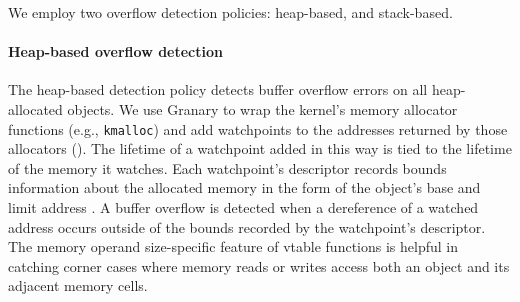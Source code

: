 \documentclass[letterpaper,twocolumn,10pt]{article}
\begin{document}
We employ two overflow detection policies: heap-based, and stack-based. %


\paragraph{Heap-based overflow detection \label{sec:heap_overflow}}
The heap-based detection policy detects buffer overflow errors on all heap-allocated objects. We use Granary to wrap the kernel's memory allocator functions (e.g., \texttt{kmalloc}) and add watchpoints to the addresses returned by those allocators (). The lifetime of a watchpoint added in this way is tied to the lifetime of the memory it watches. Each watchpoint's descriptor records bounds information about the allocated memory in the form of the object's base and limit address \cite{BccFatPointers}. A buffer overflow is detected when a dereference of a watched address occurs outside of the bounds recorded by the watchpoint's descriptor. %
The memory operand size-specific feature of vtable functions is helpful in catching corner cases where memory reads or writes access both an object and its adjacent memory cells.%

\end{document}
